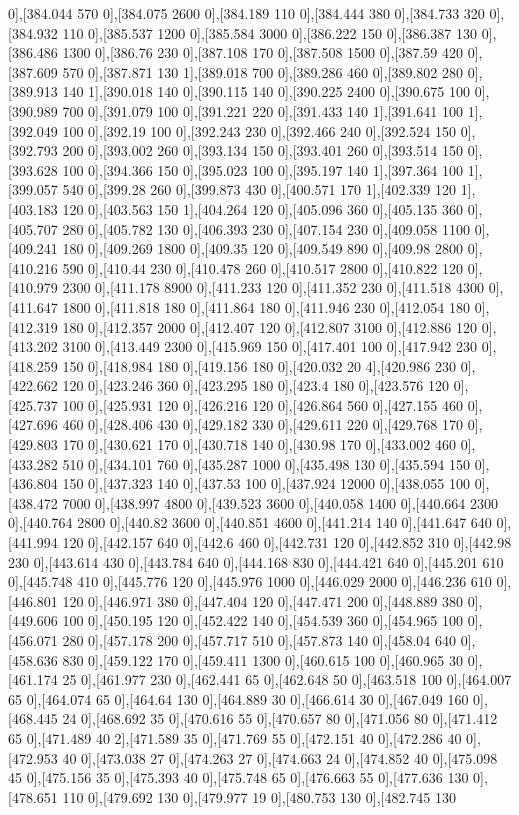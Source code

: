{0],[384.044 570 0],[384.075 2600 0],[384.189 110 0],[384.444 380 0],[384.733 320 0],[384.932 110 0],[385.537 1200 0],[385.584 3000 0],[386.222 150 0],[386.387 130 0],[386.486 1300 0],[386.76 230 0],[387.108 170 0],[387.508 1500 0],[387.59 420 0],[387.609 570 0],[387.871 130 1],[389.018 700 0],[389.286 460 0],[389.802 280 0],[389.913 140 1],[390.018 140 0],[390.115 140 0],[390.225 2400 0],[390.675 100 0],[390.989 700 0],[391.079 100 0],[391.221 220 0],[391.433 140 1],[391.641 100 1],[392.049 100 0],[392.19 100 0],[392.243 230 0],[392.466 240 0],[392.524 150 0],[392.793 200 0],[393.002 260 0],[393.134 150 0],[393.401 260 0],[393.514 150 0],[393.628 100 0],[394.366 150 0],[395.023 100 0],[395.197 140 1],[397.364 100 1],[399.057 540 0],[399.28 260 0],[399.873 430 0],[400.571 170 1],[402.339 120 1],[403.183 120 0],[403.563 150 1],[404.264 120 0],[405.096 360 0],[405.135 360 0],[405.707 280 0],[405.782 130 0],[406.393 230 0],[407.154 230 0],[409.058 1100 0],[409.241 180 0],[409.269 1800 0],[409.35 120 0],[409.549 890 0],[409.98 2800 0],[410.216 590 0],[410.44 230 0],[410.478 260 0],[410.517 2800 0],[410.822 120 0],[410.979 2300 0],[411.178 8900 0],[411.233 120 0],[411.352 230 0],[411.518 4300 0],[411.647 1800 0],[411.818 180 0],[411.864 180 0],[411.946 230 0],[412.054 180 0],[412.319 180 0],[412.357 2000 0],[412.407 120 0],[412.807 3100 0],[412.886 120 0],[413.202 3100 0],[413.449 2300 0],[415.969 150 0],[417.401 100 0],[417.942 230 0],[418.259 150 0],[418.984 180 0],[419.156 180 0],[420.032 20 4],[420.986 230 0],[422.662 120 0],[423.246 360 0],[423.295 180 0],[423.4 180 0],[423.576 120 0],[425.737 100 0],[425.931 120 0],[426.216 120 0],[426.864 560 0],[427.155 460 0],[427.696 460 0],[428.406 430 0],[429.182 330 0],[429.611 220 0],[429.768 170 0],[429.803 170 0],[430.621 170 0],[430.718 140 0],[430.98 170 0],[433.002 460 0],[433.282 510 0],[434.101 760 0],[435.287 1000 0],[435.498 130 0],[435.594 150 0],[436.804 150 0],[437.323 140 0],[437.53 100 0],[437.924 12000 0],[438.055 100 0],[438.472 7000 0],[438.997 4800 0],[439.523 3600 0],[440.058 1400 0],[440.664 2300 0],[440.764 2800 0],[440.82 3600 0],[440.851 4600 0],[441.214 140 0],[441.647 640 0],[441.994 120 0],[442.157 640 0],[442.6 460 0],[442.731 120 0],[442.852 310 0],[442.98 230 0],[443.614 430 0],[443.784 640 0],[444.168 830 0],[444.421 640 0],[445.201 610 0],[445.748 410 0],[445.776 120 0],[445.976 1000 0],[446.029 2000 0],[446.236 610 0],[446.801 120 0],[446.971 380 0],[447.404 120 0],[447.471 200 0],[448.889 380 0],[449.606 100 0],[450.195 120 0],[452.422 140 0],[454.539 360 0],[454.965 100 0],[456.071 280 0],[457.178 200 0],[457.717 510 0],[457.873 140 0],[458.04 640 0],[458.636 830 0],[459.122 170 0],[459.411 1300 0],[460.615 100 0],[460.965 30 0],[461.174 25 0],[461.977 230 0],[462.441 65 0],[462.648 50 0],[463.518 100 0],[464.007 65 0],[464.074 65 0],[464.64 130 0],[464.889 30 0],[466.614 30 0],[467.049 160 0],[468.445 24 0],[468.692 35 0],[470.616 55 0],[470.657 80 0],[471.056 80 0],[471.412 65 0],[471.489 40 2],[471.589 35 0],[471.769 55 0],[472.151 40 0],[472.286 40 0],[472.953 40 0],[473.038 27 0],[474.263 27 0],[474.663 24 0],[474.852 40 0],[475.098 45 0],[475.156 35 0],[475.393 40 0],[475.748 65 0],[476.663 55 0],[477.636 130 0],[478.651 110 0],[479.692 130 0],[479.977 19 0],[480.753 130 0],[482.745 130 }
